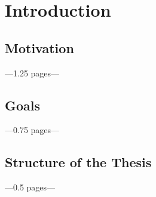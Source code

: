 \chapter{Introduction}
\label{cha:Introduction}

\section{Motivation}
---1.25 pages---

\section{Goals}
---0.75 pages---

\section{Structure of the Thesis}
---0.5 pages---